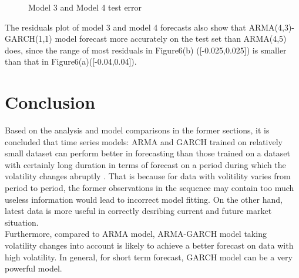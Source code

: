 \documentclass [letterpaper] {article}
\begin{document}
\begin{figure}[htp]
	\centering
	\quad
	\caption{Model 3 and Model 4 test error}
\end{figure}

 The residuals plot of model 3 and model 4 forecasts also show that ARMA(4,3)-GARCH(1,1) model forecast more accurately on the test set than ARMA(4,5) does, since the range of most residuals in Figure6(b) ([-0.025,0.025]) is smaller than that in Figure6(a)([-0.04,0.04]).
 
 
 
 \section{Conclusion}
 Based on the analysis and model comparisons in the former sections, it is concluded that time series models: ARMA and GARCH trained on relatively small dataset can perform better in forecasting than those trained on a dataset with certainly long duration in terms of forecast on a period during which the volatility changes abruptly . That is because  for data with volitility varies from period to period, the former observations in the sequence may contain too much useless information  would lead to incorrect model fitting. On the other hand, latest data is more useful in correctly desribing current and future market situation.\\
 \indent Furthermore, compared to ARMA model, ARMA-GARCH model taking volatility changes into account is likely to achieve a better forecast on data with high volatility. In general, for short term forecast, GARCH model can be a very powerful model.
 
\end{document}
